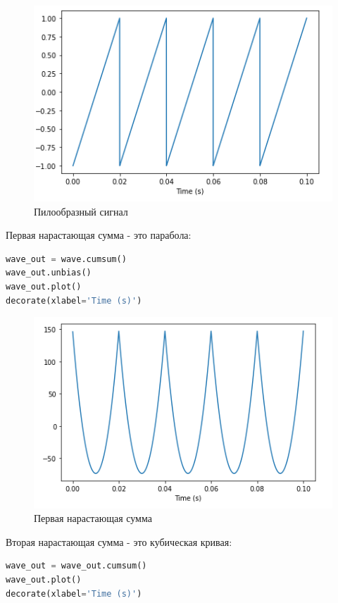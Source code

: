 \begin{figure}[H]
	\begin{center}
		\includegraphics[scale=1]{fig/lab09/lab09_07.png}
		\caption{Пилообразный сигнал}
	\end{center}
\end{figure}

Первая нарастающая сумма - это парабола:

\begin{lstlisting}[language=Python]
wave_out = wave.cumsum()
wave_out.unbias()
wave_out.plot()
decorate(xlabel='Time (s)')
\end{lstlisting}

\begin{figure}[H]
	\begin{center}
		\includegraphics[scale=1]{fig/lab09/lab09_08.png}
		\caption{Первая нарастающая сумма}
	\end{center}
\end{figure}

Вторая нарастающая сумма - это кубическая кривая:

\begin{lstlisting}[language=Python]
wave_out = wave_out.cumsum()
wave_out.plot()
decorate(xlabel='Time (s)')
\end{lstlisting}

